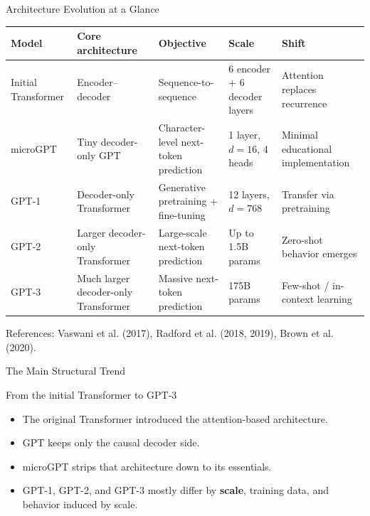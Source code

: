 \documentclass[10pt,aspectratio=169]{beamer}
\begin{document}
\begin{frame}{Architecture Evolution at a Glance}
\scriptsize
\centering
\renewcommand{\arraystretch}{1.18}
\begin{tabular}{p{1.9cm} p{2.35cm} p{2.55cm} p{2.35cm} p{2.75cm}}
\toprule
\textbf{Model} & \textbf{Core architecture} & \textbf{Objective} & \textbf{Scale} & \textbf{Shift} \\
\midrule
Initial Transformer & Encoder--decoder & Sequence-to-sequence & 6 encoder + 6 decoder layers & Attention replaces recurrence \\
microGPT & Tiny decoder-only GPT & Character-level next-token prediction & 1 layer, $d=16$, 4 heads & Minimal educational implementation \\
GPT-1 & Decoder-only Transformer & Generative pretraining + fine-tuning & 12 layers, $d=768$ & Transfer via pretraining \\
GPT-2 & Larger decoder-only Transformer & Large-scale next-token prediction & Up to 1.5B params & Zero-shot behavior emerges \\
GPT-3 & Much larger decoder-only Transformer & Massive next-token prediction & 175B params & Few-shot / in-context learning \\
\bottomrule
\end{tabular}
\vspace{0.4em}

\footnotesize References: Vaswani et al. (2017), Radford et al. (2018, 2019), Brown et al. (2020).
\end{frame}


\begin{frame}{The Main Structural Trend}
\begin{block}{From the initial Transformer to GPT-3}
\centering
{}
\end{block}
\begin{itemize}
  \item The original Transformer introduced the attention-based architecture.
  \item GPT keeps only the causal decoder side.
  \item microGPT strips that architecture down to its essentials.
  \item GPT-1, GPT-2, and GPT-3 mostly differ by \textbf{scale}, training data, and behavior induced by scale.
\end{itemize}
\end{frame}
\end{document}

